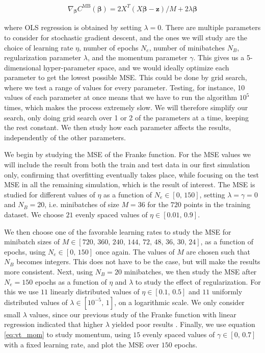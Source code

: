 \documentclass[12pt]{extarticle}
\begin{document}
\begin{align} \label{eq:SGD_gradient}
	\nabla_{\boldsymbol{\beta}}C^\mathrm{MB} (\boldsymbol{\beta})=2 X^T (X \boldsymbol{\beta} - \boldsymbol{z})/M + 2\lambda\boldsymbol{\beta}
\end{align}

where OLS regression is obtained by setting $\lambda=0$. There are multiple parameters to consider for stochastic gradient descent, and the ones we will study are the choice of learning rate $\eta$, number of epochs $N_e$, number of minibatches $N_B$, regularization parameter $\lambda$, and the momentum parameter $\gamma$. This gives us a 5-dimensional hyper-parameter space, and we would ideally optimize each parameter to get the lowest possible MSE. This could be done by grid search, where we test a range of values for every parameter. Testing, for instance, 10 values of each parameter at once means that we have to run the algorithm $10^5$ times, which makes the process extremely slow. We will therefore simplify our search, only doing grid search over 1 or 2 of the parameters at a time, keeping the rest constant. We then study how each parameter affects the results, independently of the other parameters.


We begin by studying the MSE of the Franke function. For the MSE values we will include the result from both the train and test data in our first simulation only, confirming that overfitting eventually takes place, while focusing on the test MSE in all the remaining simulation, which is the result of interest. The MSE is studied for different values of $\eta$ as a function of $N_e\in[0,\,150]$, setting $\lambda=\gamma=0$ and $N_B=20$, i.e. minibatches of size $M=36$ for the $720$ points in the training dataset. We choose $21$ evenly spaced values of $\eta\in[0.01,\,0.9]$.

We then choose one of the favorable learning rates to study the MSE for minibatch sizes of $M\in[720,\,360,\,240,\,144,\,72,\,48,\,36,\,30,\,24]$, as a function of epochs, using $N_e\in[0,\,150]$ once again. The values of $M$ are chosen such that $N_B$ becomes integers. This does not have to be the case, but will make the results more consistent. Next, using $N_B=20$ minibatches, we then study the MSE after $N_e=150$ epochs as a function of $\eta$ and $\lambda$ to study the effect of regularization. For this we use $11$ linearly distributed values of $\eta\in[0.1,\,0.5]$ and $11$ uniformly distributed values of $\lambda\in[10^{-5},\,1]$, on a logarithmic scale. We only consider small $\lambda$ values, since our previous study of the Franke function with linear regression indicated that higher $\lambda$ yielded poor results \cite{project1}. Finally, we use equation \eqref{eq:vt_mom} to study momentum, using $15$ evenly spaced values of $\gamma\in[0,\,0.7]$ with a fixed learning rate, and plot the MSE over $150$ epochs.
\end{document}
